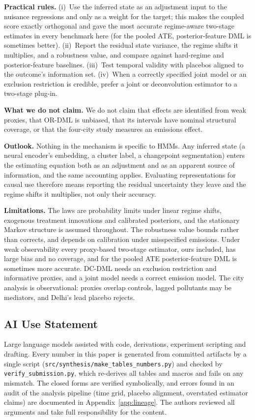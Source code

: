 \documentclass[twoside]{article}
\theoremstyle{definition}
\begin{document}
\textbf{Practical rules.} (i)~Use the inferred state as an adjustment input to the nuisance regressions and only as a weight for the target; this makes the coupled score exactly orthogonal and gave the most accurate regime-aware two-stage estimates in every benchmark here (for the pooled ATE, posterior-feature DML is sometimes better). (ii)~Report the residual state variance, the regime shifts it multiplies, and a robustness value, and compare against hard-regime and posterior-feature baselines. (iii)~Test temporal validity with placebos aligned to the outcome's information set. (iv)~When a correctly specified joint model or an exclusion restriction is credible, prefer a joint or deconvolution estimator to a two-stage plug-in.

\textbf{What we do not claim.} We do not claim that effects are identified from weak proxies, that OR-DML is unbiased, that its intervals have nominal structural coverage, or that the four-city study measures an emissions effect.

\textbf{Outlook.} Nothing in the mechanism is specific to HMMs. Any inferred state (a neural encoder's embedding, a cluster label, a changepoint segmentation) enters the estimating equation both as an adjustment and as an apparent source of information, and the same accounting applies. Evaluating representations for causal use therefore means reporting the residual uncertainty they leave and the regime shifts it multiplies, not only their accuracy.

\textbf{Limitations.} The laws are probability limits under linear regime shifts, exogenous treatment innovations and calibrated posteriors, and the stationary Markov structure is assumed throughout. The robustness value bounds rather than corrects, and depends on calibration under misspecified emissions. Under weak observability every proxy-based two-stage estimator, ours included, has large bias and no coverage, and for the pooled ATE posterior-feature DML is sometimes more accurate. DC-DML needs an exclusion restriction and informative proxies, and a joint model needs a correct emission model. The city analysis is observational: proxies overlap controls, lagged pollutants may be mediators, and Delhi's lead placebo rejects.

\clearpage
\subsection*{AI Use Statement}
Large language models assisted with code, derivations, experiment scripting and drafting. Every number in this paper is generated from committed artifacts by a single script (\texttt{src/synthesis/make\_tables\_numbers.py}) and checked by \texttt{verify\_submission.py}, which re-derives all tables and macros and fails on any mismatch. The closed forms are verified symbolically, and errors found in an audit of the analysis pipeline (time grid, placebo alignment, overstated estimator claims) are documented in Appendix~\ref{app:lineage}. The authors reviewed all arguments and take full responsibility for the content.
\end{document}
